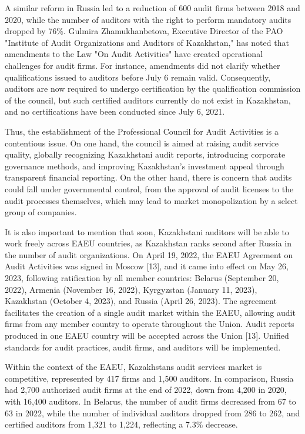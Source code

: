 A similar reform in Russia led to a reduction of 600 audit firms between
2018 and 2020, while the number of auditors with the right to perform
mandatory audits dropped by 76\%. Gulmira Zhamukhanbetova, Executive
Director of the PAO "Institute of Audit Organizations and Auditors of
Kazakhstan," has noted that amendments to the Law "On Audit Activities"
have created operational challenges for audit firms. For instance,
amendments did not clarify whether qualifications issued to auditors
before July 6 remain valid. Consequently, auditors are now required to
undergo certification by the qualification commission of the council,
but such certified auditors currently do not exist in Kazakhstan, and no
certifications have been conducted since July 6, 2021.

Thus, the establishment of the Professional Council for Audit Activities
is a contentious issue. On one hand, the council is aimed at raising
audit service quality, globally recognizing Kazakhstani audit reports,
introducing corporate governance methods, and improving Kazakhstan's
investment appeal through transparent financial reporting. On the other
hand, there is concern that audits could fall under governmental
control, from the approval of audit licenses to the audit processes
themselves, which may lead to market monopolization by a select group of
companies.

It is also important to mention that soon, Kazakhstani auditors will be
able to work freely across EAEU countries, as Kazakhstan ranks second
after Russia in the number of audit organizations. On April 19, 2022,
the EAEU Agreement on Audit Activities was signed in Moscow {[}13{]},
and it came into effect on May 26, 2023, following ratification by all
member countries: Belarus (September 20, 2022), Armenia (November 16,
2022), Kyrgyzstan (January 11, 2023), Kazakhstan (October 4, 2023), and
Russia (April 26, 2023). The agreement facilitates the creation of a
single audit market within the EAEU, allowing audit firms from any
member country to operate throughout the Union. Audit reports produced
in one EAEU country will be accepted across the Union {[}13{]}. Unified
standards for audit practices, audit firms, and auditors will be
implemented.

Within the context of the EAEU, Kazakhstan\textquotesingle s audit
services market is competitive, represented by 417 firms and 1,500
auditors. In comparison, Russia had 2,700 authorized audit firms at the
end of 2022, down from 4,200 in 2020, with 16,400 auditors. In Belarus,
the number of audit firms decreased from 67 to 63 in 2022, while the
number of individual auditors dropped from 286 to 262, and certified
auditors from 1,321 to 1,224, reflecting a 7.3\% decrease.


